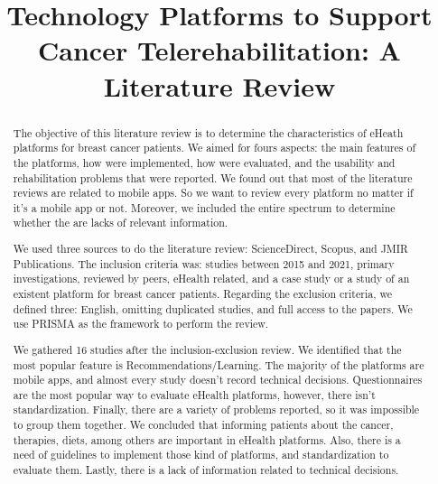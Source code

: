 \documentclass[conference]{IEEEtran}
\begin{document}
\title{Technology Platforms to Support Cancer Telerehabilitation: A Literature Review }

\author{
}

\maketitle

\begin{abstract}
The objective of this literature review is to determine the characteristics of eHeath platforms for breast cancer patients. We aimed for fours aspects: the main features of the platforms, how were implemented, how were evaluated, and the usability and rehabilitation problems that were reported. We found out that most of the literature reviews are related to mobile apps. So we want to review every platform no matter if it's a mobile app or not. Moreover, we included the entire spectrum to determine whether the are lacks of relevant information.

We used three sources to do the literature review: ScienceDirect, Scopus, and JMIR Publications. The inclusion criteria was: studies between 2015 and 2021, primary investigations, reviewed by peers, eHealth related, and a case study or a study of an existent platform for breast cancer patients. Regarding the exclusion criteria, we defined three: English, omitting duplicated studies, and full access to the papers. We use PRISMA as the framework to perform the review.

We gathered 16 studies after the inclusion-exclusion review. We identified that the most popular feature is Recommendations/Learning. The majority of the platforms are mobile apps, and almost every study doesn't record technical decisions. Questionnaires are the most popular way to evaluate eHealth platforms, however, there isn't standardization. Finally, there are a variety of problems reported, so it was impossible to group them together. We concluded that informing patients about the cancer, therapies, diets, among others are important in eHealth platforms. Also, there is a need of guidelines to implement those kind of platforms, and standardization to evaluate them. Lastly, there is a lack of information related to technical decisions.
\end{abstract}
\end{document}
